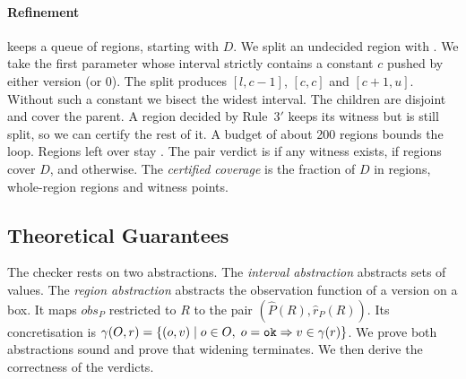 \paragraph{Refinement}
 keeps a queue of regions, starting with $D$. We split an undecided region
with . We take the first parameter whose interval strictly contains a
constant $c$ pushed by either version (or $0$). The split produces $[l, c-1]$, $[c,c]$ and
$[c+1, u]$. Without such a constant we bisect the widest interval. The children are disjoint
and cover the parent. A region decided by Rule~3$'$ keeps its witness but is still split, so
we can certify the rest of it. A budget of about 200 regions bounds the loop. Regions left over
stay \unk{}. The pair verdict is \chg{} if any witness exists, \pres{} if \pres{} regions
cover $D$, and \unk{} otherwise. The \emph{certified coverage} is the fraction of $D$ in
\pres{} regions, whole-region \chg{} regions and witness points.

\subsection{Theoretical Guarantees}
\label{sec:guarantees}

The checker rests on two abstractions. The \emph{interval abstraction} abstracts sets of
 values. The \emph{region abstraction} abstracts the observation function of a
version on a box. It maps $\mathit{obs}_P$ restricted to $R$ to the pair
$(\hat P(R), \hat r_P(R))$. Its concretisation is
$\gamma(O, r) = \left\{(o, v) \mid o \in O,\; o = \texttt{ok} \Rightarrow v \in \gamma(r)\right\}$. We prove
both abstractions sound and prove that widening terminates. We then derive the correctness of
the verdicts.

